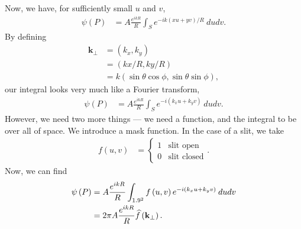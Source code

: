 \documentclass[10pt]{mypackage}
\begin{document}
\begin{example}
Now, we have, for sufficiently small $u$ and $v$,
\begin{align*}
  \psi\left(P\right) &= A\frac{e^{ikR}}{R}\int_{S}^{} e^{-ik\left(xu + yv\right)/R}\:dudv.
\end{align*}
By defining
\begin{align*}
  \mathbf{k}_{\perp} &= \left(k_x,k_y\right)\\
                     &= \left(kx/R,ky/R\right)\\
                     &= k\left(\sin\theta\cos\phi,\sin\theta\sin\phi\right),
\end{align*}
our integral looks very much like a Fourier transform,
\begin{align*}
  \psi\left(P\right) &= A\frac{e^{ikR}}{R}\int_{S}^{} e^{-i\left(k_xu + k_yv\right)}\:dudv.
\end{align*}
However, we need two more things --- we need a function, and the integral to be over all of space. We introduce a mask function. In the case of a slit, we take
\begin{align*}
  f\left(u,v\right) &= \begin{cases}
    1 & \text{slit open}\\
    0 & \text{slit closed}
  \end{cases}.
\end{align*}
Now, we can find
\begin{align*}
  \psi\left(P\right) &= A\frac{e^{ikR}}{R}\int_{1.9^2}^{} f\left(u,v\right)e^{-i\left(k_xu+k_yv\right)}\:dudv\\
                     &= 2\pi A \frac{e^{ikR}}{R}\widehat{f}\left(\mathbf{k}_{\perp}\right).
\end{align*}

\end{example}
\end{document}
